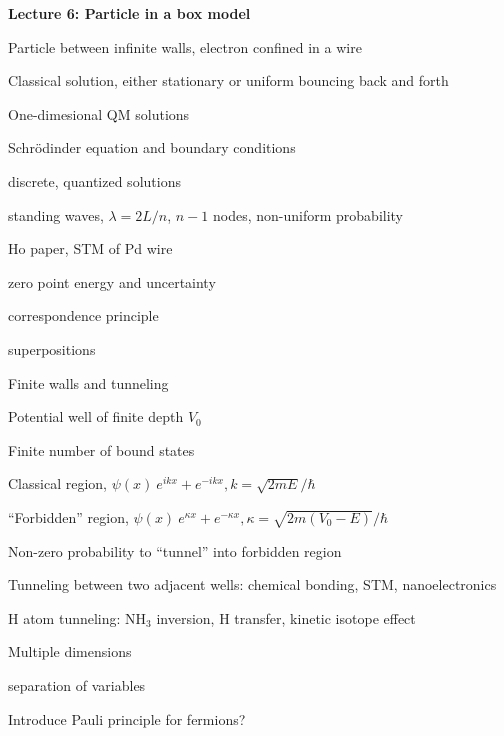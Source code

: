 \message{ !name(Outline.tex)}\documentclass[11pt]{article}
\begin{document}
\begin{outline}
\item{{\bf Lecture 6: Particle in a box model}}
  \begin{outline}
 \item{Particle between infinite walls, electron confined in a wire}
 \item Classical solution, either stationary or uniform bouncing back and forth
  \item{One-dimesional QM solutions}
    \begin{outline}
    \item Schr\"{o}dinder equation and boundary conditions
    \item discrete, quantized solutions
     \item standing waves, $\lambda=2 L/n$, $n-1$ nodes, non-uniform probability
      \item Ho paper, STM of Pd wire
      \item zero point energy and uncertainty
      \item correspondence principle
      \item superpositions
    \end{outline}
  \item{Finite walls and tunneling}
    \begin{outline}
    \item Potential well of finite depth $V_0$
    \item Finite number of bound states
    \item Classical region, $\psi(x) ~ e^{ikx}+e^{-ikx}, k=\sqrt{2mE}/\hbar$
    \item ``Forbidden'' region, $\psi(x) ~ e^{\kappa x}+e^{-\kappa x},
      \kappa=\sqrt{2m(V_0-E)}/\hbar$
    \item Non-zero probability to ``tunnel'' into forbidden region
    \item Tunneling between two adjacent wells: chemical bonding, STM, nanoelectronics
    \item H atom tunneling: NH$_3$ inversion, H transfer, kinetic isotope effect
    \end{outline}

  \item{Multiple dimensions}
    \begin{outline}
    \item separation of variables
    \end{outline}
  \item Introduce Pauli principle for fermions?


\end{outline}
\end{outline}
\end{document}
